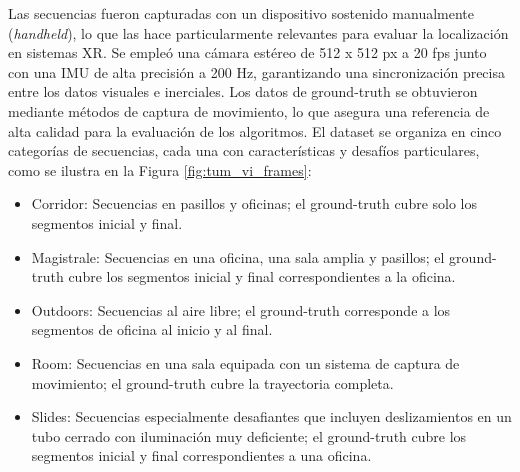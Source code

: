 Las secuencias fueron capturadas con un dispositivo sostenido manualmente (\textit{handheld}), lo que las hace particularmente relevantes para evaluar la localización en sistemas XR. Se empleó una cámara estéreo de 512 x 512 px a 20 fps junto con una IMU de alta precisión a 200 Hz, garantizando una sincronización precisa entre los datos visuales e inerciales. Los datos de ground-truth se obtuvieron mediante métodos de captura de movimiento, lo que asegura una referencia de alta calidad para la evaluación de los algoritmos. El dataset se organiza en cinco categorías de secuencias, cada una con características y desafíos particulares, como se ilustra en la Figura \ref{fig:tum_vi_frames}:
\begin{itemize}
    \item Corridor: Secuencias en pasillos y oficinas; el ground-truth cubre solo los segmentos inicial y final.
    \item Magistrale: Secuencias en una oficina, una sala amplia y pasillos; el ground-truth cubre los segmentos inicial y final correspondientes a la oficina.
    \item Outdoors: Secuencias al aire libre; el ground-truth corresponde a los segmentos de oficina al inicio y al final.
    \item Room: Secuencias en una sala equipada con un sistema de captura de movimiento; el ground-truth cubre la trayectoria completa.
    \item Slides: Secuencias especialmente desafiantes que incluyen deslizamientos en un tubo cerrado con iluminación muy deficiente; el ground-truth cubre los segmentos inicial y final correspondientes a una oficina.
\end{itemize}

